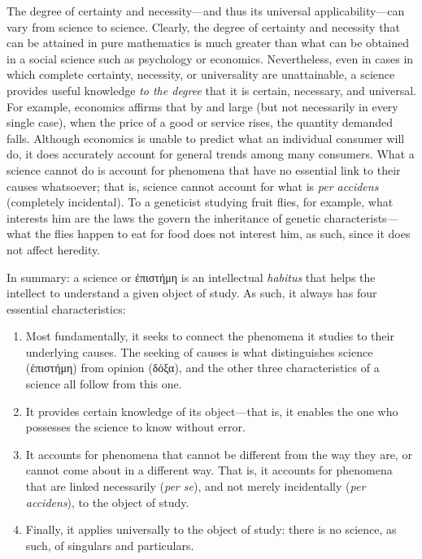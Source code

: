 \documentclass[article,12pt,a4paper,oneside]{memoir}
\begin{document}
    The degree of certainty and necessity---and thus its universal
    applicability---can vary from science to science. Clearly, the
    degree of certainty and necessity that can be attained in pure
    mathematics is much greater than what can be obtained in a social
    science such as psychology or economics. Nevertheless, even in cases
    in which complete certainty, necessity, or universality are
    unattainable, a science provides useful knowledge \emph{to the
    degree} that it is certain, necessary, and universal. For example,
    economics affirms that by and large (but not necessarily in every
    single case), when the price of a good or service rises, the
    quantity demanded falls. Although economics is unable to predict
    what an individual consumer will do, it does accurately account for
    general trends among many consumers. What a science cannot do is
    account for phenomena that have no essential link to their causes
    whatsoever; that is, science cannot account for what is \emph{per
    accidens} (completely incidental). To a geneticist studying fruit
    flies, for example, what interests him are the laws the govern the
    inheritance of genetic characterists---what the flies happen to eat
    for food does not interest him, as such, since it does not affect
    heredity.

    In summary: a science or ἐπιστήμη is an intellectual \emph{habitus}
    that helps the intellect to understand a given object of study. As
    such, it always has four essential characteristics:

    \begin{enumerate}
    \def\labelenumi{\arabic{enumi}.}
    \item
      Most fundamentally, it seeks to connect the phenomena it studies
      to their underlying causes. The seeking of causes is what
      distinguishes science (ἐπιστήμη) from opinion (δόξα), and the
      other three characteristics of a science all follow from this one.
    \item
      It provides certain knowledge of its object---that is, it enables
      the one who possesses the science to know without error.
    \item
      It accounts for phenomena that cannot be different from the way
      they are, or cannot come about in a different way. That is, it
      accounts for phenomena that are linked necessarily (\emph{per
      se}), and not merely incidentally (\emph{per accidens}), to the
      object of study.
    \item
      Finally, it applies universally to the object of study: there is
      no science, as such, of singulars and particulars.
    \end{enumerate}
\end{document}
